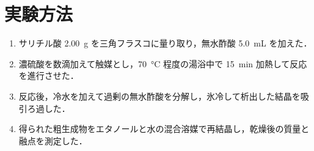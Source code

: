 \section{実験方法}
\begin{enumerate}
    \item サリチル酸 \SI{2.00}{g} を三角フラスコに量り取り，無水酢酸 \SI{5.0}{mL} を加えた．
    \item 濃硫酸を数滴加えて触媒とし，\SI{70}{\celsius} 程度の湯浴中で \SI{15}{min} 加熱して反応を進行させた．
    \item 反応後，冷水を加えて過剰の無水酢酸を分解し，氷冷して析出した結晶を吸引ろ過した．
    \item 得られた粗生成物をエタノールと水の混合溶媒で再結晶し，乾燥後の質量と融点を測定した．
\end{enumerate}